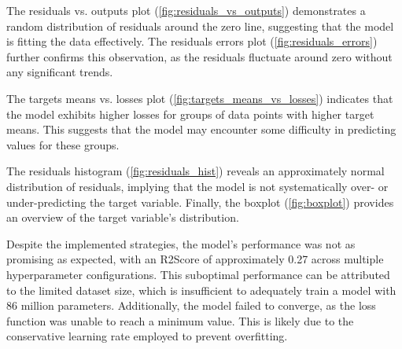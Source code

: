 The residuals vs. outputs plot (\ref{fig:residuals_vs_outputs}) demonstrates a random distribution of residuals around the zero line, suggesting that the model is fitting the data effectively. The residuals errors plot (\ref{fig:residuals_errors}) further confirms this observation, as the residuals fluctuate around zero without any significant trends.

The targets means vs. losses plot (\ref{fig:targets_means_vs_losses}) indicates that the model exhibits higher losses for groups of data points with higher target means. This suggests that the model may encounter some difficulty in predicting values for these groups.

The residuals histogram (\ref{fig:residuals_hist}) reveals an approximately normal distribution of residuals, implying that the model is not systematically over- or under-predicting the target variable. Finally, the boxplot (\ref{fig:boxplot}) provides an overview of the target variable's distribution.

Despite the implemented strategies, the model's performance was not as promising as expected, with an R2Score of approximately 0.27 across multiple hyperparameter configurations. This suboptimal performance can be attributed to the limited dataset size, which is insufficient to adequately train a model with 86 million parameters. Additionally, the model failed to converge, as the loss function was unable to reach a minimum value. This is likely due to the conservative learning rate employed to prevent overfitting.